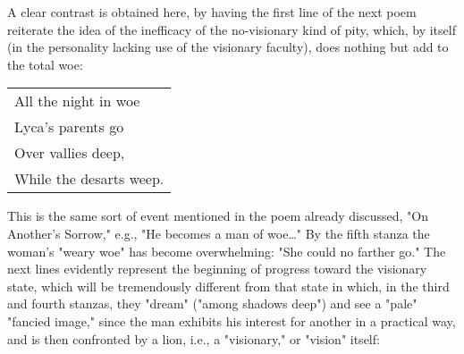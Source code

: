 A clear contrast is obtained here, by having the first line of the next poem reiterate the idea of the inefficacy of the
no-visionary kind of pity, which, by itself (in the personality lacking use of the visionary faculty), does nothing but add to the total woe:\par
\begin{center}
	\begin{tabular}{l}
		All the night in woe \\
		Lyca's parents go    \\
		Over vallies deep,   \\
		While the desarts weep.
	\end{tabular}
\end{center}
\hspace*{5mm}This is the same sort of event mentioned in the poem already discussed, "On Another's Sorrow," e.g., "He becomes
a man of woe\dots" By the fifth stanza the woman's "weary woe" has become overwhelming: "She could no farther go."
The next lines evidently represent the beginning of progress toward the visionary state, which will be tremendously different from
that state in which, in the third and fourth stanzas, they "dream" ("among shadows deep") and see a "pale" "fancied image," since
the man exhibits his interest for another in a practical way, and is then confronted by a lion, i.e., a "visionary," or "vision" itself:\par

\newpage

